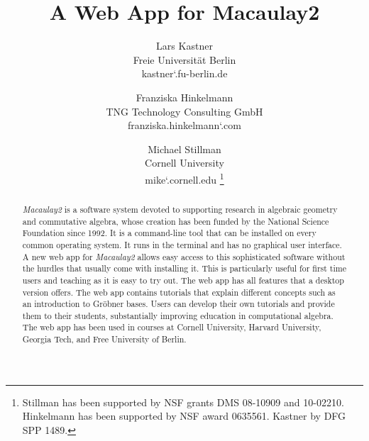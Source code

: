 \documentclass[twocolumn]{article}
\title{A Web App for Macaulay2}
\author{Lars Kastner\\ Freie Universit\"at Berlin \\{\small kastner\char`\@math.fu-berlin.de} \and 
Franziska Hinkelmann\\TNG Technology Consulting GmbH \\{\small franziska.hinkelmann\char`\@tngtech.com} \and 
Michael Stillman\\Cornell University \\{\small mike\char`\@math.cornell.edu} \thanks{Stillman has been supported by NSF grants DMS 08-10909 and 10-02210. Hinkelmann has been supported by NSF award 0635561. Kastner by DFG SPP 1489. 
} }
\date{}
\def\M2{{\it Macaulay2}}
\begin{document}
\ifpdf
{}
\else
{}
\fi



\maketitle



\begin{abstract}
    \M2 is a software system devoted to supporting research in algebraic
    geometry and commutative algebra, whose creation has been funded by the
    National Science Foundation since 1992. It is a command-line tool that
    can be installed on every common operating system. It runs in the terminal
    and has no graphical user
    interface. A new web app for \M2 allows easy
    access to this sophisticated software without the hurdles that
    usually come with installing it. This is particularly useful for
    first time users and teaching as it is easy to try out. The
    web app has all features that a desktop version offers. The web app contains tutorials
    that explain different concepts such as an introduction to
    Gr\"obner bases. Users can develop their own tutorials and provide
    them to their students, substantially improving education in computational algebra.
    The web app has been used in courses at Cornell
    University, Harvard University, Georgia Tech, and Free University of Berlin.
\end{abstract}
\end{document}

